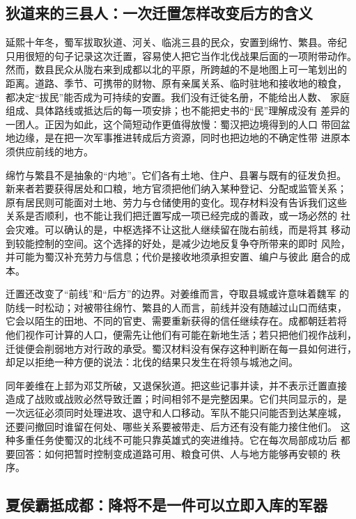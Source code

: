 \subsection{狄道来的三县人：一次迁置怎样改变后方的含义}

延熙十年冬，蜀军拔取狄道、河关、临洮三县的民众，安置到绵竹、繁县。帝纪
只用很短的句子记录这次迁置，容易使人把它当作北伐战果后面的一项附带动作。
然而，数县民众从陇右来到成都以北的平原，所跨越的不是地图上可一笔划出的
距离。道路、季节、可携带的财物、原有亲属关系、临时驻地和接收地的粮食，
都决定“拔民”能否成为可持续的安置。我们没有迁徙名册，不能给出人数、
家庭组成、具体路线或抵达后的每一项安排；也不能把史书的“民”理解成没有
差异的一团人。正因为如此，这个简短动作更值得放慢：蜀汉把边境得到的人口
带回盆地边缘，是在把一次军事推进转成后方资源，同时也把边地的不确定性带
进原本须供应前线的地方。

绵竹与繁县不是抽象的“内地”。它们各有土地、住户、县署与既有的征发负担。
新来者若要获得居处和口粮，地方官须把他们纳入某种登记、分配或监管关系；
原有居民则可能面对土地、劳力与仓储使用的变化。现存材料没有告诉我们这些
关系是否顺利，也不能让我们把迁置写成一项已经完成的善政，或一场必然的
社会灾难。可以确认的是，中枢选择不让这批人继续留在陇右前线，而是将其
移动到较能控制的空间。这个选择的好处，是减少边地反复争夺所带来的即时
风险，并可能为蜀汉补充劳力与信息；代价是接收地须承担安置、编户与彼此
磨合的成本。

迁置还改变了“前线”和“后方”的边界。对姜维而言，夺取县城或许意味着魏军
的防线一时松动；对被带往绵竹、繁县的人而言，前线并没有随越过山口而结束，
它会以陌生的田地、不同的官吏、需要重新获得的信任继续存在。成都朝廷若将
他们视作可计算的人口，便需先让他们有可能在新地生活；若只把他们视作战利，
迁徙便会削弱地方对行政的承受。蜀汉材料没有保存这种判断在每一县如何进行，
却足以拒绝一种方便的说法：北伐的结果只发生在将领与城池之间。

同年姜维在上邽为邓艾所破，又退保狄道。把这些记事并读，并不表示迁置直接
造成了战败或战败必然导致迁置；时间相邻不是完整因果。它们共同显示的，是
一次远征必须同时处理进攻、退守和人口移动。军队不能只问能否到达某座城，
还要问撤回时谁留在何处、哪些关系要被带走、后方还有没有能力接住他们。
这种多重任务使蜀汉的北线不可能只靠英雄式的突进维持。它在每次局部成功后
都要回答：如何把暂时控制变成道路可用、粮食可供、人与地方能够再安顿的
秩序。

\subsection{夏侯霸抵成都：降将不是一件可以立即入库的军器}

